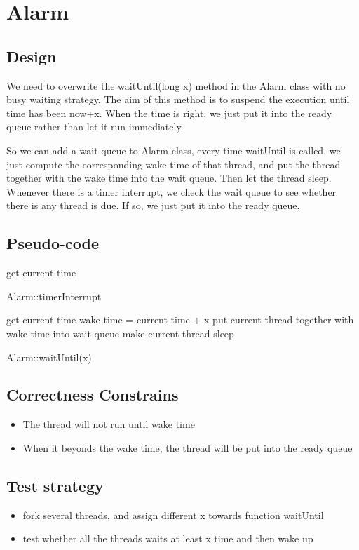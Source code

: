 \documentclass[a4paper,10pt]{article}
\begin{document}
\section{Alarm}

\subsection {Design}

We need to overwrite the waitUntil(long x) method in the Alarm class with no busy waiting strategy. The aim of this method is to suspend the execution until time has been now+x. When the time is right, we just put it into the ready queue rather than let it run immediately.

So we can add a wait queue to Alarm class, every time waitUntil is called, we just compute the corresponding wake time of that thread, and put the thread together with the wake time into the wait queue. Then let the thread sleep. Whenever there is a timer interrupt, we check the wait queue to see whether there is any thread is due. If so, we just put it into the ready queue.

\subsection {Pseudo-code}

\begin{algorithm}
get current time\;
\caption{Alarm::timerInterrupt}
\end{algorithm}

\begin{algorithm}
get current time\;
wake time = current time + x\;
put current thread together with wake time into wait queue\;
make current thread sleep
\caption{Alarm::waitUntil(x)}
\end{algorithm}
\subsection{Correctness Constrains}
\begin{itemize}
\item The thread will not run until wake time
\item When it beyonds the wake time, the thread will be put into the ready queue
\end{itemize}

\subsection {Test strategy}
\begin{itemize}
\item fork several threads, and assign different x towards function waitUntil
\item test whether all the threads waits at least x time and then wake up
\end{itemize}
\end{document}
